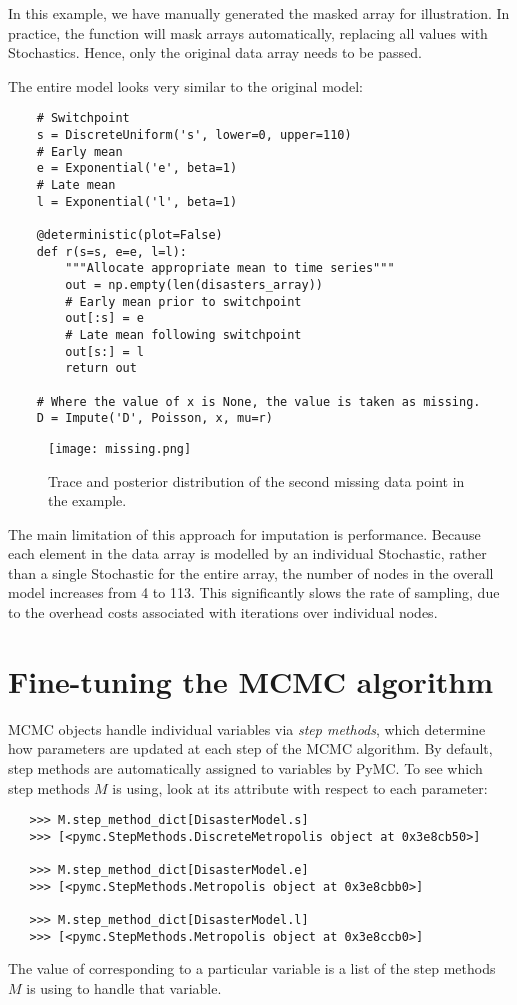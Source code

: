 In this example, we have manually generated the masked array for illustration. In practice, the  function will mask arrays automatically, replacing all  values with Stochastics. Hence, only the original data array needs to be passed.

The entire model looks very similar to the original model:

\begin{verbatim}
	# Switchpoint
	s = DiscreteUniform('s', lower=0, upper=110)
	# Early mean
	e = Exponential('e', beta=1)
	# Late mean
	l = Exponential('l', beta=1)

	@deterministic(plot=False)
	def r(s=s, e=e, l=l):
	    """Allocate appropriate mean to time series"""
	    out = np.empty(len(disasters_array))
	    # Early mean prior to switchpoint
	    out[:s] = e
	    # Late mean following switchpoint
	    out[s:] = l
	    return out

	# Where the value of x is None, the value is taken as missing.
	D = Impute('D', Poisson, x, mu=r)
\end{verbatim}

\begin{figure}[ht]
\begin{center}
\texttt{[image: missing.png]}
\caption{Trace and posterior distribution of the second missing data point in the example.}
\label{fig:missing}
\end{center}
\end{figure}


The main limitation of this approach for imputation is performance. Because each
element in the data array is modelled by an individual Stochastic, rather than a
single Stochastic for the entire array, the number of nodes in the overall model
increases from 4 to 113. This significantly slows the rate of sampling, due to
the overhead costs associated with iterations over individual nodes.



\section{Fine-tuning the MCMC algorithm}

MCMC objects handle individual variables via \emph{step methods}, which determine how parameters are updated at each step of the MCMC algorithm. By default, step methods are automatically assigned to variables by PyMC. To see which step methods $M$ is using, look at its  attribute with respect to each parameter:
\begin{verbatim}
   >>> M.step_method_dict[DisasterModel.s]
   >>> [<pymc.StepMethods.DiscreteMetropolis object at 0x3e8cb50>]

   >>> M.step_method_dict[DisasterModel.e]
   >>> [<pymc.StepMethods.Metropolis object at 0x3e8cbb0>]

   >>> M.step_method_dict[DisasterModel.l]
   >>> [<pymc.StepMethods.Metropolis object at 0x3e8ccb0>]
\end{verbatim}
The value of  corresponding to a particular variable is a list of the step methods $M$ is using to handle that variable.

